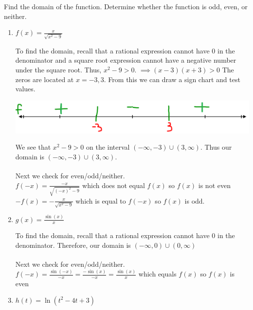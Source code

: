 \documentclass[nooutcomes, noinstructornotes]{ximera}
\begin{document}
\begin{problem}
Find the domain of the function.  Determine whether the function is odd, even, or neither.

\begin{enumerate}
	\item $f(x)=\frac{x}{\sqrt{x^2-9}}$
		\begin{freeResponse}
			To find the domain, recall that a rational expression cannot have $0$ in the denominator and a square root expression cannot have a negative number under the square root.  Thus, $x^2-9>0$.
			$\implies (x-3)(x+3)>0$  The zeros are located at $x=-3,3$.  From this we can draw a sign chart and test values.
		\begin{image}		
	\includegraphics[scale=0.2]{Figure9.png}
	\end{image}
		We see that $x^2-9>0$ on the interval $(-\infty,-3)\cup (3,\infty)$.  Thus our domain is $(-\infty,-3)\cup (3,\infty)$.\\ \\

		Next we check for even/odd/neither.\\
		$f(-x)=\frac{-x}{\sqrt{(-x)^2-9}}$ which does not equal $f(x)$ so $f(x)$ is not even\\
		$-f(x)=-\frac{x}{\sqrt{x^2-9}}$ which is equal to $f(-x)$ so $f(x)$ is odd.
		
		\end{freeResponse}

	\item $g(x)= \frac{\sin(x)}{x}$
		\begin{freeResponse}
	To find the domain, recall that a rational expression cannot have $0$ in the denominator.  Therefore, our domain is $(-\infty,0) \cup (0,\infty)$\\ \\
	
	Next we check for even/odd/neither.\\
		$f(-x)= \frac{\sin(-x)}{-x}=\frac{-\sin(x)}{-x}=\frac{\sin(x)}{x}$ which equals $f(x)$ so $f(x)$ is even


		\end{freeResponse}

	\item $h(t)= \ln(t^2-4t+3)$


\end{enumerate}
\end{problem}
\end{document}
